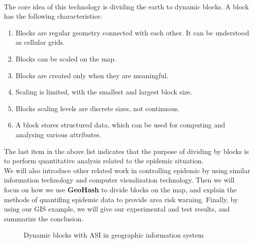 \documentclass[sigplan,screen]{acmart}
\begin{document}
\\
The core idea of this technology is dividing the earth to dynamic blocks. A block has the following characteristics:
\begin{enumerate}
	\item Blocks are regular geometry connected with each other. It can be understood as cellular grids.
	\item Blocks can be scaled on the map.
	\item Blocks are created only when they are meaningful.
	\item Scaling is limited, with the smallest and largest block size.
	\item Blocks scaling levels are discrete sizes, not continuous.
	\item A block stores structured data, which can be used for computing and analysing various attributes.
\end{enumerate}
The last item in the above list indicates that the purpose of dividing by blocks is to perform quantitative analysis related to the epidemic situation.
\\
We will also introduce other related work in controlling epidemic by using similar information technology and computer visualization technology.
Then we will focus on how we use \textbf{GeoHash} to divide blocks on the map, and explain the methods of quantifing epidemic data to provide area risk warning.
Finally, by using our GIS example, we will give our experimental and test results, and summarize the conclusion.
\begin{figure}[hptb]
	\centering
	\caption{Dynamic blocks with ASI in geographic information system}
\end{figure}
\end{document}
